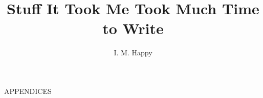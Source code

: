\documentclass{BaylorThesis_phd} %
\title{Stuff It Took Me Took Much Time to Write}
\author{I. M. Happy}
\begin{document}

\setlength{\abovedisplayskip}{3pt}
\setlength{\belowdisplayskip}{3pt}


% 

% 

% 

% 




\clearpage
\vspace*{4.25in}
 \begin{center}
      APPENDICES
 \end{center}
 \pagestyle{plain}
  \pagebreak

\newpage
\appendix
\renewcommand\thesection{\Alph{chapter}.\arabic{section}}



\newpage
\raggedright
{}

\end{document}
